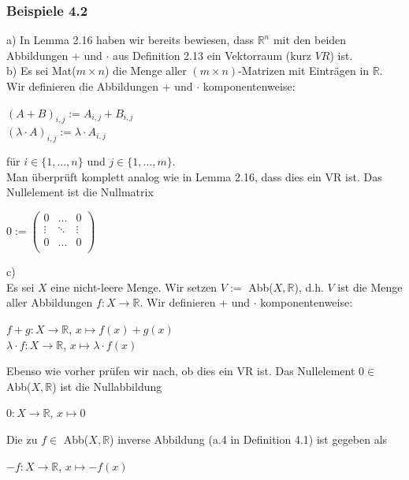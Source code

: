 \documentclass{article}
\begin{document}
\subsubsection*{Beispiele 4.2}
a) 
In Lemma 2.16 haben wir bereits bewiesen, dass $\mathbb{R}^n$ mit den beiden Abbildungen + und $\cdot$ aus Definition 2.13 ein Vektorraum (kurz $\textit{VR}$) ist. \\
b) 
Es sei Mat($m \times n$) die Menge aller $(m \times n)$-Matrizen mit Einträgen in $\mathbb{R}$. Wir definieren die Abbildungen + und $\cdot$ komponentenweise: \\
\begin{center}
    $(A+B)_{i,j} := A_{i,j} + B_{i,j}$ \\
    $(\lambda \cdot A)_{i,j} := \lambda \cdot A_{i,j}$ \\
\end{center}
für $i \in \{1,...,n\}$ und $j \in \{1,...,m\}$. \\
Man überprüft komplett analog wie in Lemma 2.16, dass dies ein VR ist. Das Nullelement ist die Nullmatrix \\
\begin{center}
    $0 := \begin{pmatrix}
        0 & ... & 0 \\
        \vdots & \ddots & \vdots \\
        0 & ... & 0 \\
    \end{pmatrix}$ \\
\end{center}
c) \\
Es sei $X$ eine nicht-leere Menge. Wir setzen $V := $ Abb($X, \mathbb{R}$), d.h. $V$ ist die Menge aller Abbildungen $f: X \rightarrow \mathbb{R}$. Wir definieren + und $\cdot$ komponentenweise: \\
\begin{center}
    $f+g: X \rightarrow \mathbb{R}$, $x \mapsto f(x)+g(x)$ \\
    $\lambda \cdot f: X \rightarrow \mathbb{R}$, $x \mapsto \lambda \cdot f(x)$ \\
\end{center}
Ebenso wie vorher prüfen wir nach, ob dies ein VR ist. Das Nullelement $ 0 \in$ Abb($X, \mathbb{R}$) ist die Nullabbildung \\
\begin{center}
    $0: X \rightarrow \mathbb{R}$, $x \mapsto 0$ \\
\end{center}
Die zu $f \in$ Abb($X, \mathbb{R}$) inverse Abbildung (a.4 in Definition 4.1) ist gegeben als \\
\begin{center}
    $-f: X \rightarrow \mathbb{R}$, $x \mapsto -f(x)$ \\
\end{center}
\end{document}

